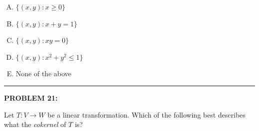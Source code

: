 \documentclass[12pt]{amsart}
\newcommand{\divider}{
  \vspace{-1em} %
  \noindent
  \raisebox{-0.15ex}{\textbullet}%
  \hspace{0.5em}%
  \rule[0.5ex]{0.95\textwidth}{1.0pt}%
  \hspace{0.5em}%
  \raisebox{-0.15ex}{\textbullet}%
  \vspace{0em} %
}
\begin{document}
\begin{enumerate}[(A)]
\item $\{(x, y) : x \geq 0\}$
\item $\{(x, y) : x + y = 1\}$
\item $\{(x, y) : xy = 0\}$ 
\item $\{(x, y) : x^2 + y^2 \leq 1\}$ 
\item None of the above
\end{enumerate}


\divider



\newpage



{\bf PROBLEM 21:}

Let $T: V \to W$ be a linear transformation. Which of the following best describes what the \emph{cokernel} of $T$ is?
\end{document}
